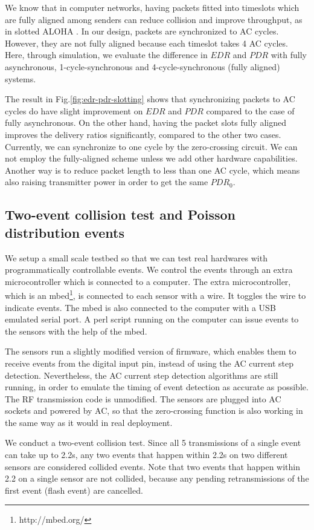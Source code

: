 We know that in computer networks, having packets fitted into timeslots which are fully aligned among senders can reduce collision and improve throughput, as in slotted ALOHA \cite{Roberts1975}. In our design, packets are synchronized to AC cycles. However, they are not fully aligned because each timeslot takes 4 AC cycles. Here, through simulation, we evaluate the difference in $EDR$ and $PDR$ with fully asynchronous, 1-cycle-synchronous and 4-cycle-synchronous (fully aligned) systems. 

The result in Fig.\ref{fig:edr-pdr-slotting} shows that synchronizing packets to AC cycles do have slight improvement on $EDR$ and $PDR$ compared to the case of fully asynchronous. On the other hand, having the packet slots fully aligned improves the delivery ratios significantly, compared to the other two cases. Currently, we can synchronize to one cycle by the zero-crossing circuit. We can not employ the fully-aligned scheme unless we add other hardware capabilities. Another way is to reduce packet length to less than one AC cycle, which means also raising transmitter power in order to get the same $PDR_0$. 

\subsection{Two-event collision test and Poisson distribution events}

We setup a small scale testbed so that we can test real hardwares with programmatically controllable events. We control the events through an extra microcontroller which is connected to a computer. The extra microcontroller, which is an mbed\footnote{http://mbed.org/}, is connected to each sensor with a wire. It toggles the wire to indicate events. The mbed is also connected to the computer with a USB emulated serial port. A perl script running on the computer can issue events to the sensors with the help of the mbed. 

The sensors run a slightly modified version of firmware, which enables them to receive events from the digital input pin, instead of using the AC current step detection. Nevertheless, the AC current step detection algorithms are still running, in order to emulate the timing of event detection as accurate as possible. The RF transmission code is unmodified. The sensors are plugged into AC sockets and powered by AC, so that the zero-crossing function is also working in the same way as it would in real deployment. 

We conduct a two-event collision test. Since all 5 transmissions of a single event can take up to 2.2s, any two events that happen within 2.2s on two different sensors are considered collided events. Note that two events that happen within 2.2 on a single sensor are not collided, because any pending retransmissions of the first event (flash event) are cancelled. 

